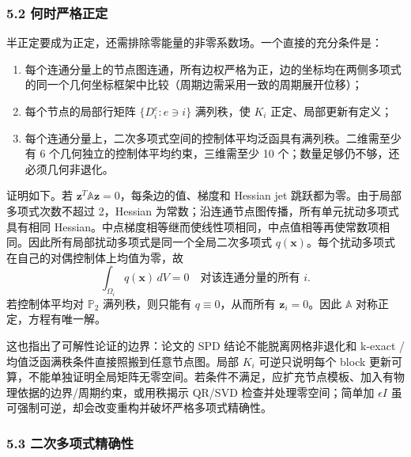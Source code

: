 \documentclass[
  12pt,
  UTF8]{ctexart}
\providecommand{\tightlist}{%
  \setlength{\itemsep}{0pt}\setlength{\parskip}{0pt}}
\begin{document}
\hypertarget{ux4f55ux65f6ux4e25ux683cux6b63ux5b9a}{%
\subsubsection{5.2
何时严格正定}\label{ux4f55ux65f6ux4e25ux683cux6b63ux5b9a}}

半正定要成为正定，还需排除零能量的非零系数场。一个直接的充分条件是：

\begin{enumerate}
\def\labelenumi{\arabic{enumi}.}
\tightlist
\item
  每个连通分量上的节点图连通，所有边权严格为正，边的坐标均在两侧多项式的同一个几何坐标框架中比较（周期边需采用一致的周期展开位移）；
\item
  每个节点的局部行矩阵 \(\{D_i^e:e\ni i\}\) 满列秩，使 \(K_i\)
  正定、局部更新有定义；
\item
  每个连通分量上，二次多项式空间的控制体平均泛函具有满列秩。二维需至少有
  6 个几何独立的控制体平均约束，三维需至少 10
  个；数量足够仍不够，还必须几何非退化。
\end{enumerate}

证明如下。若
\(\boldsymbol z^T\mathbb A\boldsymbol z=0\)，每条边的值、梯度和 Hessian
jet 跳跃都为零。由于局部多项式次数不超过 2，Hessian
为常数；沿连通节点图传播，所有单元扰动多项式具有相同
Hessian。中点梯度相等继而使线性项相同，中点值相等再使常数项相同。因此所有局部扰动多项式是同一个全局二次多项式
\(q(\boldsymbol x)\)。每个扰动多项式在自己的对偶控制体上均值为零，故 \begin{equation}
\int_{\Omega_i}q(\boldsymbol x)\,dV=0\quad\text{对该连通分量的所有 }i.\end{equation} 若控制体平均对 \(\mathbb P_2\) 满列秩，则只能有
\(q\equiv0\)，从而所有 \(\boldsymbol z_i=0\)。因此 \(\mathbb A\)
对称正定，方程有唯一解。

这也指出了可解性论证的边界：论文的 SPD 结论不能脱离网格非退化和 k-exact
/ 均值泛函满秩条件直接照搬到任意节点图。局部 \(K_i\) 可逆只说明每个
block
更新可算，不能单独证明全局矩阵无零空间。若条件不满足，应扩充节点模板、加入有物理依据的边界/周期约束，或用秩揭示
QR/SVD 检查并处理零空间；简单加 \(\epsilon I\)
虽可强制可逆，却会改变重构并破坏严格多项式精确性。

\hypertarget{ux4e8cux6b21ux591aux9879ux5f0fux7cbeux786eux6027}{%
\subsubsection{5.3
二次多项式精确性}\label{ux4e8cux6b21ux591aux9879ux5f0fux7cbeux786eux6027}}
\end{document}
